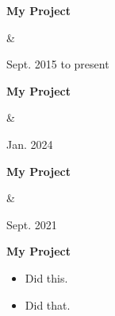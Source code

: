 \documentclass[10pt, letterpaper]{article}
\newenvironment{highlights}{
        \begin{itemize}[
                topsep=0pt,
                parsep=0.10 cm,
                partopsep=0pt,
                itemsep=0pt,
                after=\relax,
                leftmargin=0.4 cm + 3pt
            ]
    }{
        \end{itemize}
    } %
\let\originalTabularx\tabularx
\let\originalEndTabularx\endtabularx
\renewenvironment{tabularx}{\bgroup\centering\originalTabularx}{\originalEndTabularx\par\egroup}
\begin{document}
        \vspace{0.2 cm}
        \begin{tabularx}{
            \textwidth-0.4 cm-0.13cm
        }{
            K{0.2 cm}
            R{4.1 cm}
        }
            \textbf{My Project}

            \vspace{0.10 cm}

            &
            

            Sept. 2015 to present
        \end{tabularx}


        \vspace{0.2 cm}
        \begin{tabularx}{
            \textwidth-0.4 cm-0.13cm
        }{
            K{0.2 cm}
            R{4.1 cm}
        }
            \textbf{My Project}

            \vspace{0.10 cm}

            &
            

            Jan. 2024
        \end{tabularx}


        \vspace{0.2 cm}
        \begin{tabularx}{
            \textwidth-0.4 cm-0.13cm
        }{
            K{0.2 cm}
            R{4.1 cm}
        }
            \textbf{My Project}

            \vspace{0.10 cm}

            &
            

            Sept. 2021
        \end{tabularx}


        \vspace{0.2 cm}
        \begin{tabularx}{
            \textwidth-0.4 cm-0.13cm
        }{
            K{0.2 cm}
        }
            \textbf{My Project}

            \vspace{0.10 cm}

            \begin{highlights}
                \item Did this.
                \item Did that.
            \end{highlights}
        \end{tabularx}
\end{document}
